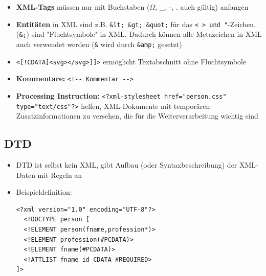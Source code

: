 \documentclass[12pt,landscape]{article}
\def\code#1{\texttt{#1}} %
\begin{document}
\begin{multicols}{3}
\begin{itemize}
\item \textbf{XML-Tags} müssen nur mit Buchstaben ($\Omega$, \_, -, . auch gültig) anfangen
\item \textbf{Entitäten} in XML sind z.B. \lstinline|&lt; &gt; &quot;| für das \code{< > und "}-Zeichen. (\lstinline|&;|) sind "Fluchtsymbole" in XML. Dadurch können alle Metazeichen in XML auch verwendet werden (\lstinline|&| wird durch \lstinline|&amp;| gesetzt)
\item \lstinline|<[!CDATA[<svg></svg>]]>| ermöglicht Textabschnitt ohne Fluchtsymbole
\item \textbf{Kommentare:} \lstinline|<!-- Kommentar -->|
\item \textbf{Processing Instruction:} \lstinline|<?xml-stylesheet href="person.css" type="text/css"?>| helfen, XML-Dokumente mit temporären Zusatzinformationen zu versehen, die für die Weiterverarbeitung wichtig sind
\end{itemize}
\subsection{DTD}
\begin{itemize}
\item DTD ist selbst kein XML, gibt Aufbau (oder Syntaxbeschreibung) der XML-Daten mit Regeln an
\item Beispieldefinition:
\begin{lstlisting}
<?xml version="1.0" encoding="UTF-8"?>
  <!DOCTYPE person [
  <!ELEMENT person(fname,profession*)>
  <!ELEMENT profession(#PCDATA)>
  <!ELEMENT fname(#PCDATA)>
  <!ATTLIST fname id CDATA #REQUIRED>
]>


\end{lstlisting}
\end{itemize}
\end{multicols}
\end{document}
